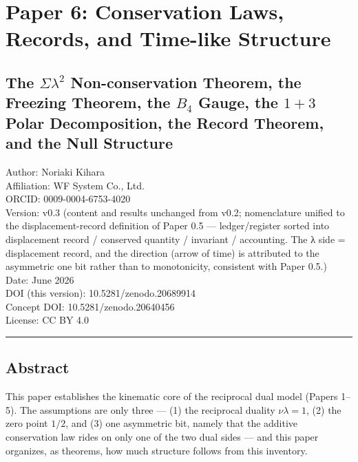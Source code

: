\documentclass[
]{ltjsarticle}
\author{}
\date{}
\begin{document}
\section{Paper 6: Conservation Laws, Records, and Time-like
Structure}\label{paper-6-conservation-laws-records-and-time-like-structure}

\subsection{\texorpdfstring{The \(\Sigma\lambda^2\) Non-conservation
Theorem, the Freezing Theorem, the \(B_4\) Gauge, the \(1{+}3\) Polar
Decomposition, the Record Theorem, and the Null
Structure}{The \textbackslash Sigma\textbackslash lambda\^{}2 Non-conservation Theorem, the Freezing Theorem, the B\_4 Gauge, the 1\{+\}3 Polar Decomposition, the Record Theorem, and the Null Structure}}\label{the-sigmalambda2-non-conservation-theorem-the-freezing-theorem-the-b_4-gauge-the-13-polar-decomposition-the-record-theorem-and-the-null-structure}

Author: Noriaki Kihara\\
Affiliation: WF System Co., Ltd.\\
ORCID: 0009-0004-6753-4020\\
Version: v0.3 (content and results unchanged from v0.2; nomenclature
unified to the displacement-record definition of Paper 0.5 ---
ledger/register sorted into displacement record / conserved quantity /
invariant / accounting. The λ side = displacement record, and the
direction (arrow of time) is attributed to the asymmetric one bit rather
than to monotonicity, consistent with Paper 0.5.)\\
Date: June 2026\\
DOI (this version): 10.5281/zenodo.20689914\\
Concept DOI: 10.5281/zenodo.20640456\\
License: CC BY 4.0

\begin{center}\rule{0.5\linewidth}{0.5pt}\end{center}

\subsection{Abstract}\label{abstract}

This paper establishes the kinematic core of the reciprocal dual model
(Papers 1--5). The assumptions are only three --- (1) the reciprocal
duality \(\nu\lambda=1\), (2) the zero point \(1/2\), and (3) one
asymmetric bit, namely that the additive conservation law rides on only
one of the two dual sides --- and this paper organizes, as theorems, how
much structure follows from this inventory.
\end{document}
